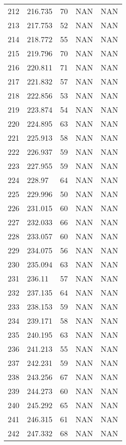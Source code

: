 \documentclass{article}
\begin{document}
\begin{longtable}{@{}lllll@{}}
				212 & 216.735 & 70    & NAN   & NAN   \\
				213 & 217.753 & 52    & NAN   & NAN   \\
				214 & 218.772 & 55    & NAN   & NAN   \\
				215 & 219.796 & 70    & NAN   & NAN   \\
				216 & 220.811 & 71    & NAN   & NAN   \\
				217 & 221.832 & 57    & NAN   & NAN   \\
				218 & 222.856 & 53    & NAN   & NAN   \\
				219 & 223.874 & 54    & NAN   & NAN   \\
				220 & 224.895 & 63    & NAN   & NAN   \\
				221 & 225.913 & 58    & NAN   & NAN   \\
				222 & 226.937 & 59    & NAN   & NAN   \\
				223 & 227.955 & 59    & NAN   & NAN   \\
				224 & 228.97  & 64    & NAN   & NAN   \\
				225 & 229.996 & 50    & NAN   & NAN   \\
				226 & 231.015 & 60    & NAN   & NAN   \\
				227 & 232.033 & 66    & NAN   & NAN   \\
				228 & 233.057 & 60    & NAN   & NAN   \\
				229 & 234.075 & 56    & NAN   & NAN   \\
				230 & 235.094 & 63    & NAN   & NAN   \\
				231 & 236.11  & 57    & NAN   & NAN   \\
				232 & 237.135 & 64    & NAN   & NAN   \\
				233 & 238.153 & 59    & NAN   & NAN   \\
				234 & 239.171 & 58    & NAN   & NAN   \\
				235 & 240.195 & 63    & NAN   & NAN   \\
				236 & 241.213 & 55    & NAN   & NAN   \\
				237 & 242.231 & 59    & NAN   & NAN   \\
				238 & 243.256 & 67    & NAN   & NAN   \\
				239 & 244.273 & 60    & NAN   & NAN   \\
				240 & 245.292 & 65    & NAN   & NAN   \\
				241 & 246.315 & 61    & NAN   & NAN   \\
				242 & 247.332 & 68    & NAN   & NAN   \\

\end{longtable}
\end{document}
